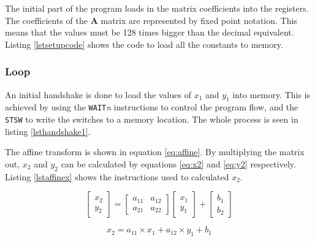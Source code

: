 The initial part of the program loads in the matrix coefficients into the registers. 
The coefficients of the \textbf{A} matrix are represented by fixed point notation. 
This means that the values must be 128 times bigger than the decimal equivalent.
Listing \ref{lstsetupcode} shows the code to load all the constants to memory.




\subsubsection{Loop}

An initial handshake is done to load the values of $x_1$ and $y_1$ into memory. 
This is achieved by using the \texttt{WAIT}\textit{n} instructions to control the program flow, and the \texttt{STSW} to write the switches to a memory location. 
The whole process is seen in listing \ref{lsthandshake1}.




The affine transform is shown in equation \eqref{eq:affine}.
By multiplying the matrix out, $x_2$ and $y_2$ can be calculated by equations \eqref{eq:x2} and \eqref{eq:y2} respectively. 
Listing \ref{lstaffinex} shows the instructions used to calculated $x_2$. 

\begin{equation}\label{eq:affine}
\begin{bmatrix}
x_2 \\
y_2 
\end{bmatrix}
=
\begin{bmatrix}
a_{11} & a_{12} \\
a_{21} & a_{22} 
\end{bmatrix}
\begin{bmatrix}
x_1 \\
y_1
\end{bmatrix}
+
\begin{bmatrix}
b_1 \\
b_2
\end{bmatrix}
\end{equation}

\begin{equation}\label{eq:x2}
x_2 = a_{11} \times x_1 + a_{12} \times y_1 + b_1
\end{equation}

